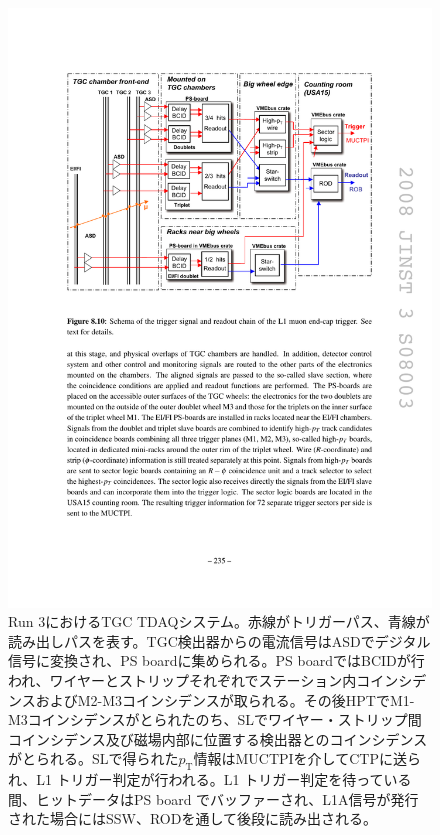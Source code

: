 \begin{figure} 
\centering
\includegraphics[width=16cm]{fig/Intro/TGC_run3tdaq.pdf}
\caption[Run 3におけるTGC TDAQシステム]{Run 3におけるTGC TDAQシステム。赤線がトリガーパス、青線が読み出しパスを表す。TGC検出器からの電流信号はASDでデジタル信号に変換され、PS boardに集められる。PS boardではBCIDが行われ、ワイヤーとストリップそれぞれでステーション内コインシデンスおよびM2-M3コインシデンスが取られる。その後HPTでM1-M3コインシデンスがとられたのち、SLでワイヤー・ストリップ間コインシデンス及び磁場内部に位置する検出器とのコインシデンスがとられる。SLで得られた$p_\mathrm{T}$情報はMUCTPIを介してCTPに送られ、L1 トリガー判定が行われる。L1 トリガー判定を待っている間、ヒットデータはPS board でバッファーされ、L1A信号が発行された場合にはSSW、RODを通して後段に読み出される。}
\label{TGC_run3tdaq}
\end{figure}


